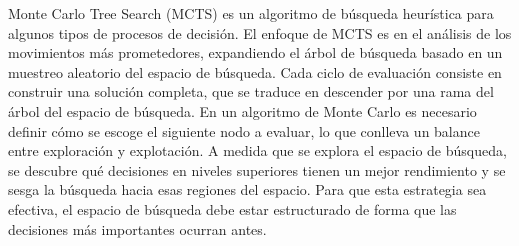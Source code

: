 Monte Carlo Tree Search (MCTS) es un algoritmo de búsqueda heurística para algunos tipos de procesos de decisión. El enfoque de MCTS es en el análisis de los movimientos más prometedores, expandiendo el árbol de búsqueda basado en un muestreo aleatorio del espacio de búsqueda. Cada ciclo de evaluación consiste en construir una solución completa, que se traduce en descender por una rama del árbol del espacio de búsqueda. En un algoritmo de Monte Carlo es necesario definir cómo se escoge el siguiente nodo a evaluar, lo que conlleva un balance entre exploración y explotación. A medida que se explora el espacio de búsqueda, se descubre qué decisiones en niveles superiores tienen un mejor rendimiento y se sesga la búsqueda hacia esas regiones del espacio. Para que esta estrategia sea efectiva, el espacio de búsqueda debe estar estructurado de forma que las decisiones más importantes ocurran antes.




